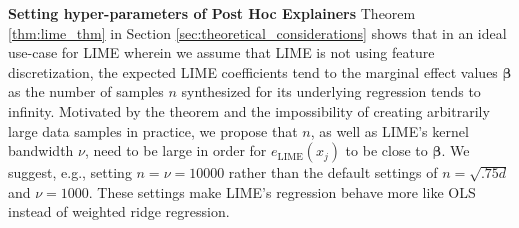 \documentclass[12pt]{article}  %
\begin{document}



    
    \noindent\textbf{Setting hyper-parameters of Post Hoc Explainers} 
      \label{sec:lime_params}
      Theorem \ref{thm:lime_thm} in Section \ref{sec:theoretical_considerations} shows that in an ideal use-case for LIME wherein we assume that LIME is not using feature discretization, the expected LIME coefficients tend to the marginal effect values $\boldsymbol{\beta}$ as the number of samples $n$ synthesized for its underlying regression tends to infinity. Motivated by the theorem and the impossibility of creating arbitrarily large data samples in practice, we propose that $n$, as well as LIME's kernel bandwidth $\nu$, need to be large in order for $e_{\text{LIME}}(x_j)$ to be close to $\boldsymbol{\beta}$. We suggest, e.g., setting $n=\nu=10000$ rather than the default settings of $n=\sqrt{.75d}$ and $\nu=1000$. These settings make LIME's regression behave more like OLS instead of weighted ridge regression.
      
     
\end{document}
